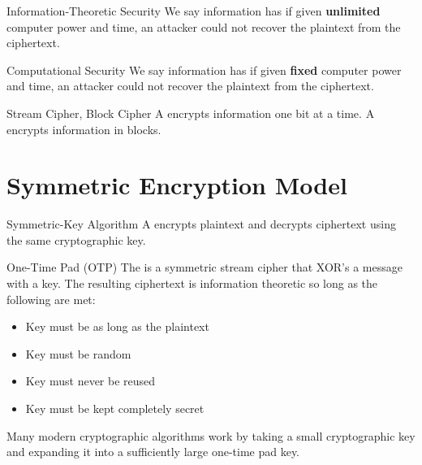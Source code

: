 \documentclass[12pt]{report}
\begin{document}
\begin{dfnbox}{Information-Theoretic Security}{}
    We say information has  if given \textbf{unlimited} computer power and time, an attacker could not recover the plaintext from the ciphertext.
\end{dfnbox}

\begin{dfnbox}{Computational Security}{}
    We say information has  if given \textbf{fixed} computer power and time, an attacker could not recover the plaintext from the ciphertext.
\end{dfnbox}

\begin{dfnbox}{Stream Cipher, Block Cipher}{}
    A  encrypts information one bit at a time.     A  encrypts information in blocks.
\end{dfnbox}

\section{Symmetric Encryption Model}

\begin{dfnbox}{Symmetric-Key Algorithm}{}
    A  encrypts plaintext and decrypts ciphertext using the same cryptographic key.
\end{dfnbox}

\begin{dfnbox}{One-Time Pad (OTP)}{}
    The  is a symmetric stream cipher that XOR's a message with a key. The resulting ciphertext is information theoretic so long as the following are met:
    \begin{itemize}[noitemsep]
        \item Key must be as long as the plaintext
        \item Key must be random
        \item Key must never be reused
        \item Key must be kept completely secret
   \end{itemize}
\end{dfnbox}

Many modern cryptographic algorithms work by taking a small cryptographic key and expanding it into a sufficiently large one-time pad key.
\end{document}
